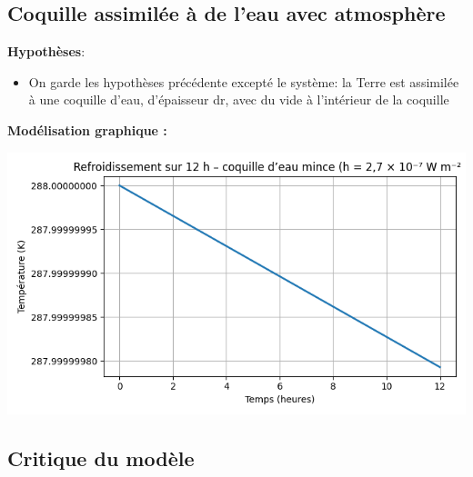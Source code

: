 \documentclass[a4paper,12pt]{article}
\begin{document}
\subsection{Coquille assimilée à de l'eau avec atmosphère }
\textbf{Hypothèses}:
\begin{itemize}
    \item On garde les hypothèses précédente excepté le système: la Terre est assimilée à une coquille d'eau, d'épaisseur dr, avec du vide à l'intérieur de la coquille \end{itemize}
\textbf{Modélisation graphique :} 
    
    \includegraphics[width=0.8\linewidth]{../modele2/figures/modele2_coquille.png}    


\subsection{Critique du modèle}
\end{document}
